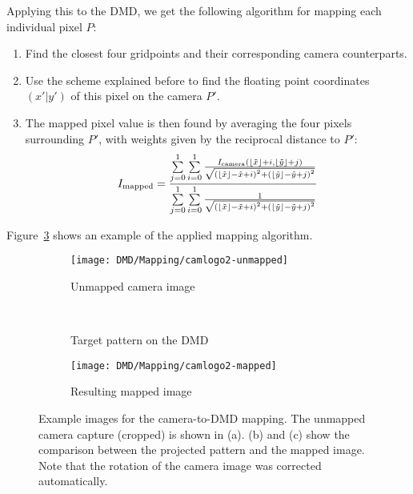 Applying this to the DMD, we get the following algorithm for mapping each individual pixel $P$:
\begin{enumerate}
    \item Find the closest four gridpoints and their corresponding camera counterparts.
    \item Use the scheme explained before to find the floating point coordinates $(x' | y')$ of this pixel on the camera $P'$.
    \item The mapped pixel value is then found by averaging the four pixels surrounding $P'$, with weights given by the reciprocal distance to $P'$: \[I_\text{mapped} = \frac{\sum\limits_{j=0}^1 \sum\limits_{i=0}^1 \frac{I_\text{camera}(\lfloor\tilde{x}\rfloor + i,\lfloor\tilde{y}\rfloor + j)}{\sqrt{\left(\lfloor\tilde{x}\rfloor - \tilde{x} + i\right)^2 + \left(\lfloor\tilde{y}\rfloor - \tilde{y} + j\right)^2}}}{\sum\limits_{j=0}^1 \sum\limits_{i=0}^1 \frac{1}{\sqrt{\left(\lfloor\tilde{x}\rfloor - \tilde{x} + i\right)^2 + \left(\lfloor\tilde{y}\rfloor - \tilde{y} + j\right)^2}}} \]
\end{enumerate}
Figure~\ref{fig:mapping_example} shows an example of the applied mapping algorithm.
\begin{figure}[htbp]
    \centering
    \begin{subfigure}[c]{0.5\textwidth}
        \texttt{[image: DMD/Mapping/camlogo2-unmapped]}
        \caption{Unmapped camera image}
    \end{subfigure}\\ \vspace{1ex}
    \begin{subfigure}[c]{0.43\textwidth}
        \caption{Target pattern on the DMD}
        \label{fig:mapping_example_target}
    \end{subfigure}
    \begin{subfigure}[c]{0.43\textwidth}
        \texttt{[image: DMD/Mapping/camlogo2-mapped]}
        \caption{Resulting mapped image}
        \label{fig:mapping_example_mapped}
    \end{subfigure}
    \caption[Example images for the camera-to-DMD mapping]{Example images for the camera-to-DMD mapping. The unmapped camera capture (cropped) is shown in (a). (b) and (c) show the comparison between the projected pattern and the mapped image. Note that the rotation of the camera image was corrected automatically.}
    \label{fig:mapping_example}
\end{figure}


